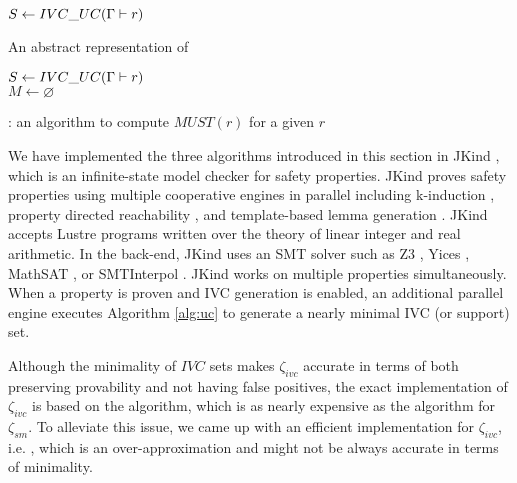 \begin{algorithm}
  \BlankLine
  $S \leftarrow {IVC\_UC}(\Gamma \vdash r)$ \\
   {
  }
\caption{An abstract representation of \ucbfalg \cite{Ghass16}}
\label{alg:ucbf}
\end{algorithm}


\begin{algorithm}
  \BlankLine
  $S \leftarrow {IVC\_UC}(\Gamma \vdash r)$ \\
  $M \leftarrow \varnothing$ \\
   {
  }
\caption{\mustalg: an algorithm to compute $MUST(r)$ for a given $r$}
\label{alg:must}
\end{algorithm}

We have implemented the three algorithms introduced in this section in JKind \cite{jkind}, which is an infinite-state model checker for safety properties. JKind proves safety properties using multiple cooperative engines in parallel including k-induction \cite{SheeranSS00}, property directed reachability \cite{Een2011:PDR}, and template-based lemma generation \cite{Kahsai2011}. JKind accepts
Lustre programs written over the theory of linear integer and real
arithmetic. In the back-end, JKind uses an SMT solver such as
Z3 \cite{DeMoura08:z3}, Yices \cite{Dutertre06:yices},
MathSAT \cite{Cimatti2013:MathSAT}, or SMTInterpol \cite{Christ2012:SMTInterpol}.
JKind works on multiple properties simultaneously. When a
property is proven and IVC generation is enabled, an additional
parallel engine executes Algorithm \ref{alg:uc} to generate a nearly minimal
IVC (or support) set.

Although the minimality of $IVC$ sets makes $\zeta_{ivc}$ accurate
in terms of both preserving provability and not having false positives, the exact implementation of $\zeta_{ivc}$ is based on the \ucbfalg algorithm, which is as nearly expensive as the \mustalg algorithm for $\zeta_{sm}$. To alleviate this issue, we came up with an efficient implementation for $\zeta_{ivc}$, i.e. \ucalg \cite{Ghass16},
 which is an over-approximation and might not be always accurate in terms of minimality.

